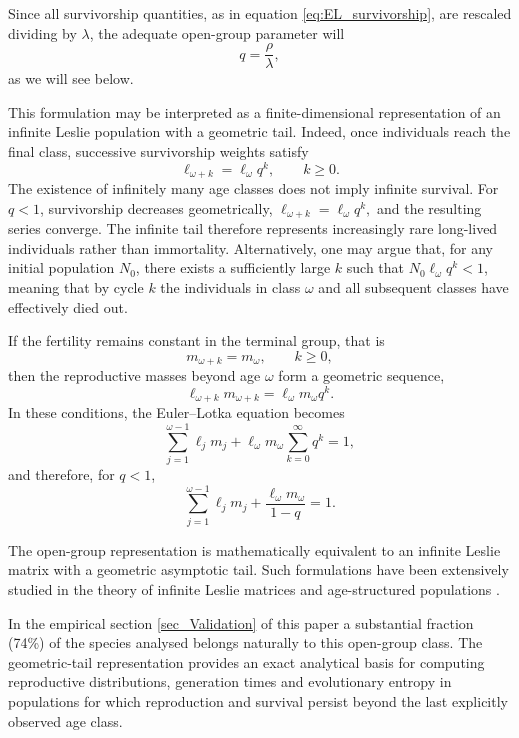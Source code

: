 \documentclass[10pt,a4paper]{amsart}
\theoremstyle{definition}
\theoremstyle{remark}
\numberwithin{equation}{section}
\begin{document}
Since all survivorship quantities, as in equation \eqref{eq:EL_survivorship}, are rescaled dividing by $\lambda$, the adequate open-group parameter will
\[
q=\frac{\rho}{\lambda},
\]
as we will see below.


This formulation may be interpreted as a finite-dimensional
representation of an infinite Leslie population with a geometric tail.
Indeed, once individuals reach the final class, successive survivorship weights satisfy
\[
\ell_{\omega+k}
=
\ell_\omega q^k,
\qquad k\geq0.
\]
The existence of infinitely many age classes does not imply infinite
survival. For \(q<1\), survivorship decreases geometrically,
$
\ell_{\omega+k}=\ell_\omega q^k,
$
and the resulting series converge. The infinite tail therefore
represents increasingly rare long-lived individuals rather than
immortality.
Alternatively, one may argue that, for any initial population $N_0$, there exists a sufficiently large $k$ such that $N_0 \ell_\omega q^k < 1$, meaning that by cycle $k$ the individuals in class $\omega$ and all subsequent classes have effectively died out.

If the fertility remains constant in the terminal group, that is
\[
m_{\omega+k}=m_\omega,
\qquad k\geq0,
\]
then the reproductive masses beyond age $\omega$ form a
geometric sequence,
\[
\ell_{\omega+k}m_{\omega+k}
=
\ell_\omega m_\omega q^k.
\]
In these conditions, the Euler--Lotka equation becomes
\begin{equation}
\sum_{j=1}^{\omega-1}
\ell_jm_j
+
\ell_\omega m_\omega
\sum_{k=0}^{\infty}
q^k
=
1,
\end{equation}
and therefore, for $q<1$, 
\begin{equation}\label{eq_EL2}
\sum_{j=1}^{\omega-1}
\ell_jm_j
+
\frac{\ell_\omega m_\omega}
{1-q}
=
1.
\end{equation}

The open-group representation is mathematically equivalent to an infinite Leslie matrix with a geometric asymptotic tail. 
Such formulations have been extensively studied in the theory of
infinite Leslie matrices and age-structured populations
\cite{Cus,ElaydiCushing2024,Gosselin,jalves3,jalves2,Demetrius72}.

In the empirical section \ref{sec_Validation} of this paper a substantial fraction (74\%) of the
species analysed belongs naturally to this open-group class.
The geometric-tail representation provides an exact analytical basis for
computing reproductive distributions, generation times and
evolutionary entropy in populations for which reproduction and survival
persist beyond the last explicitly observed age class.
\end{document}
